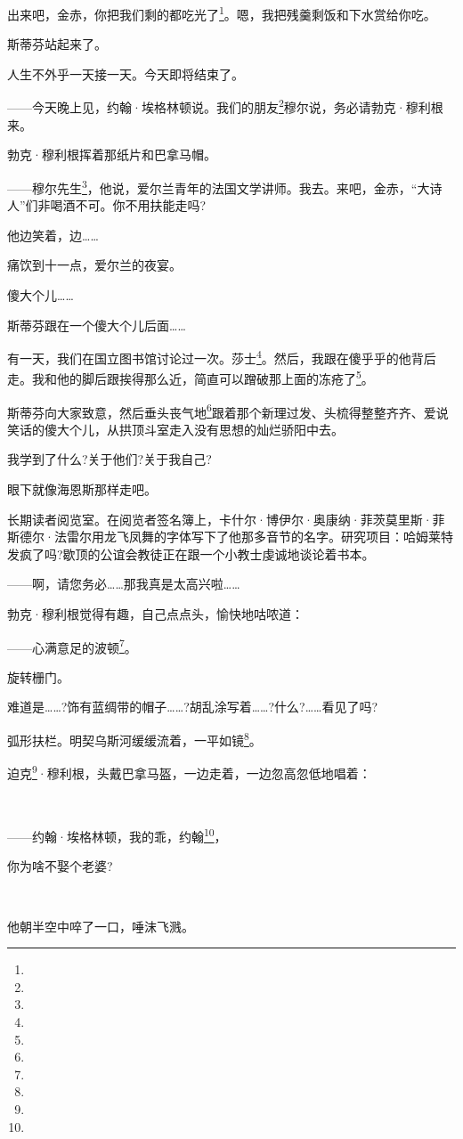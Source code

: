 \par 出来吧，金赤，你把我们剩的都吃光了\footnote{}。嗯，我把残羹剩饭和下水赏给你吃。
\par 斯蒂芬站起来了。
\par 人生不外乎一天接一天。今天即将结束了。
\par ——今天晚上见，约翰·埃格林顿说。我们的朋友\footnote{}穆尔说，务必请勃克·穆利根来。
\par 勃克·穆利根挥着那纸片和巴拿马帽。
\par ——穆尔先生\footnote{}，他说，爱尔兰青年的法国文学讲师。我去。来吧，金赤，“大诗人”们非喝酒不可。你不用扶能走吗?
\par 他边笑着，边……
\par 痛饮到十一点，爱尔兰的夜宴。
\par 傻大个儿……
\par 斯蒂芬跟在一个傻大个儿后面……
\par 有一天，我们在国立图书馆讨论过一次。莎士\footnote{}。然后，我跟在傻乎乎的他背后走。我和他的脚后跟挨得那么近，简直可以蹭破那上面的冻疮了\footnote{}。
\par 斯蒂芬向大家致意，然后垂头丧气地\footnote{}跟着那个新理过发、头梳得整整齐齐、爱说笑话的傻大个儿，从拱顶斗室走入没有思想的灿烂骄阳中去。
\par 我学到了什么?关于他们?关于我自己?
\par 眼下就像海恩斯那样走吧。
\par 长期读者阅览室。在阅览者签名簿上，卡什尔·博伊尔·奥康纳·菲茨莫里斯·菲斯德尔·法雷尔用龙飞凤舞的字体写下了他那多音节的名字。研究项目：哈姆莱特发疯了吗?歇顶的公谊会教徒正在跟一个小教士虔诚地谈论着书本。
\par ——啊，请您务必……那我真是太高兴啦……
\par 勃克·穆利根觉得有趣，自己点点头，愉快地咕哝道：
\par ——心满意足的波顿\footnote{}。
\par 旋转栅门。
\par 难道是……?饰有蓝绸带的帽子……?胡乱涂写着……?什么?……看见了吗?
\par 弧形扶栏。明契乌斯河缓缓流着，一平如镜\footnote{}。
\par 迫克\footnote{}·穆利根，头戴巴拿马盔，一边走着，一边忽高忽低地唱着：
\par  
\par ——约翰·埃格林顿，我的乖，约翰\footnote{}，
\par 你为啥不娶个老婆?
\par  
\par 他朝半空中啐了一口，唾沫飞溅。
